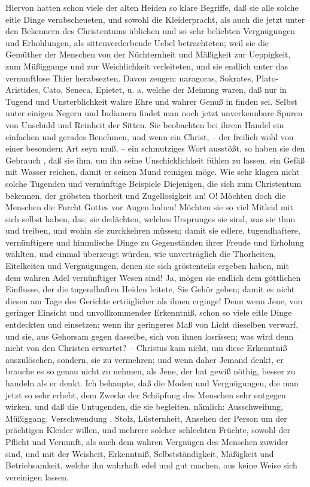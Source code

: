Hiervon hatten schon viele der alten Heiden so klare Begriffe, daß sie alle
solche eitle Dinge verabscheueten, und sowohl die Kleiderpracht, als auch die
jetzt unter den Bekennern des Christentums üblichen und so sehr beliebten
Vergnügungen und Erhohlungen, als sittenverderbende Uebel betrachteten; weil sie
die Gemüther der Menschen von der Nüchternheit und Mäßigkeit zur Ueppigkeit, zum
Müßiggange und zur Weichlichkeit verleiteten, und sie endlich unter das
vernunftlose Thier herabsezten. Davon zeugen: naragoras, Sokrates, Plato-
Aristides, Cato, Seneca, Epietet, u. a. welche der Meinung waren, daß nur in
Tugend und Unsterblichkeit wahre Ehre und wahrer Genuß in finden sei. Selbst
unter einigen Negern und Indianern findet man noch jetzt unverkennbare Spuren
von Unschuld und Reinheit der Sitten. Sie beobachten bei ihrem Handel ein
einfachen und gerades Benehmen, und wenn ein Christ, -- der freilich wohl von
einer besondern Art seyn muß, -- ein schmutziges Wort ausstößt, so haben sie den
Gebrauch , daß sie ihm, um ihn seine Unschicklichkeit fühlen zu lassen, ein
Gefäß mit Wasser reichen, damit er seinen Mund reinigen möge. Wie sehr klagen
nicht solche Tugenden und vernünftige Beispiele Diejenigen, die sich zum
Christentum bekennen, der gröbsten thorheit und Zugellosigkeit an! O! Möchten
doch die Menschen die Furcht Gottes vor Augen haben! Möchten sie so viel Mitleid
mit sich selbst haben, das; sie dedächten, welches Ursprunges sie sind, was sie
thun und treiben, und wohin sie zurckkehren müssen; damit sie edlere,
tugendhaftere, vernünftigere und himmlische Dinge zu Gegenständen ihrer Freude
und Erholung wählten, und einmal überzeugt würden, wie unverträglich die
Thorheiten, Eitelkeiten und Vergnügungen, denen sie sich gröstenteils ergeben
haben, mit dem wahren Adel vernünftiger Wesen sind! Ja, mögen sie endlich dem
göttlichen Einflusse, der die tugendhaften Heiden leitete, Sie Gehör geben;
damit es nicht diesen am Tage des Gerichte erträglicher als ihnen erginge! Denn
wenn Jene, von geringer Einsicht und unvollkommender Erkenntniß, schon so viele
eitle Dinge entdeckten und einsetzen; wenn ihr geringeres Maß von Licht
dieselben verwarf, und sie, aus Gehorsam gegen dasselbe, sich von ihnen
losrissen; was wird denn nicht von den Christen erwartet? -- Christus kam nicht,
um diese Erkenntniß auszulöschen, sondern, sie zu vermehren; und wenn daher
Jemand denkt, er brauche es so genau nicht zu nehmen, als Jene, der hat gewiß
nöthig, besser zu handeln als er denkt. Ich behaupte, daß die Moden und
Vergnügungeu, die man jetzt so sehr erhebt, dem Zwecke der Schöpfung des
Menschen sehr entgegen wirken, und daß die Untugenden, die sie begleiten,
nämlich: Ausschweifung, Müßiggang, Verschwendung , Stolz, Lüsternheit, Ansehen
der Person um der prächtigen Kleider willen, und mehrere solcher schlechten
Früchte, sowohl der Pflicht und Vernunft, als auch dem wahren Vergnügen des
Menschen zuwider sind, und mit der Weisheit, Erkenntniß, Selbstständigkeit,
Mäßigkeit und Betriebsamkeit, welche ihn wahrhaft edel und gut machen, aus keine
Weise sich vereinigen lassen.

